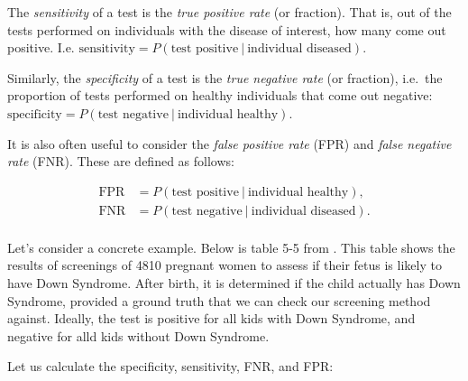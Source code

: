 \documentclass[]{book}
\theoremstyle{definition}
\theoremstyle{definition}
\theoremstyle{definition}
\theoremstyle{remark}
\begin{document}
The \emph{sensitivity} of a test is the \emph{true positive rate} (or fraction). That is, out of the tests performed on individuals with the disease of interest, how many come out positive. I.e. \(\text{sensitivity} = P(\text{test positive}\ |\ \text{individual diseased})\).

Similarly, the \emph{specificity} of a test is the \emph{true negative rate} (or fraction), i.e.~the proportion of tests performed on healthy individuals that come out negative: \(\text{specificity} = P(\text{test negative}\ |\ \text{individual healthy})\).

It is also often useful to consider the \emph{false positive rate} (FPR) and \emph{false negative rate} (FNR). These are defined as follows:

\begin{align*}
  \text{FPR} &= P(\text{test positive}\ |\ \text{individual healthy}), \\
  \text{FNR} &= P(\text{test negative}\ |\ \text{individual diseased}). \\
\end{align*}

Let's consider a concrete example. Below is table 5-5 from \citet{ls}. This table shows the results of screenings of 4810 pregnant women to assess if their fetus is likely to have Down Syndrome. After birth, it is determined if the child actually has Down Syndrome, provided a ground truth that we can check our screening method against. Ideally, the test is positive for all kids with Down Syndrome, and negative for alld kids without Down Syndrome.

\hypertarget{htmlwidget-c618f2bd1060fb3dd51e}{}

Let us calculate the specificity, sensitivity, FNR, and FPR:
\end{document}
